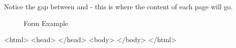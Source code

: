 
Notice the gap between  and  - this is where the content of each page will go.

\begin{figure}[H]
    \caption{Form Example} \label{fig:form_example}
\end{figure}


\begin{html}
<html>
    <head>
    </head>
    <body>
    </body>
</html>
\end{html}
